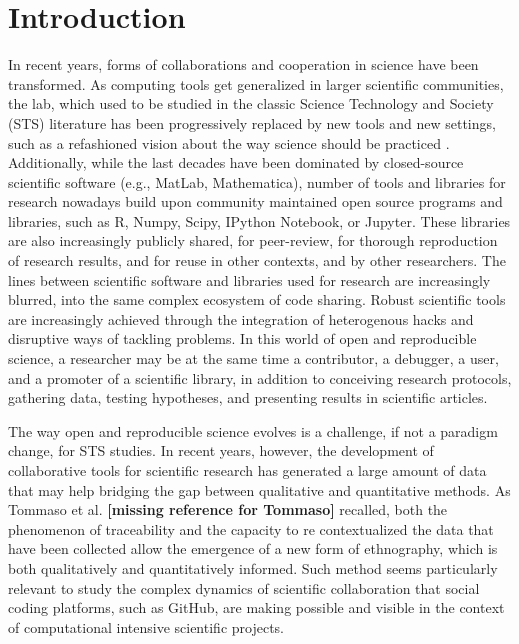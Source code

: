 \section{Introduction}
In recent years, forms of collaborations and cooperation in science have been transformed. As computing tools get generalized in larger scientific communities, the lab, which used to be studied in the classic Science Technology and Society (STS) literature \cite{latour1987science,houdart2008cour} has been progressively replaced by new tools and new settings, such as a refashioned vision \cite{galison1996disunity,kitchin2014big} about the way science should be practiced \cite{calvert2013collaboration,leonelli2012introduction}. Additionally, while the last decades have been dominated by closed-source scientific software (e.g., MatLab, Mathematica), number of tools and libraries for research nowadays build upon community maintained open source programs and libraries, such as R, Numpy, Scipy, IPython Notebook, or Jupyter. These libraries are also increasingly publicly shared, for peer-review, for thorough reproduction of research results, and for reuse in other contexts, and by other researchers. The lines between scientific software and libraries used for research are increasingly blurred, into the same complex ecosystem of code sharing. Robust scientific tools are increasingly achieved through the integration of heterogenous hacks and disruptive ways of tackling problems. In this world of open and reproducible science, a researcher may be at the same time a contributor, a debugger, a user, and a promoter of a scientific library, in addition to conceiving research protocols, gathering data, testing hypotheses, and presenting results in scientific articles.

The way open and reproducible science evolves is a challenge, if not a paradigm change, for STS studies. In recent years, however, the development of collaborative tools for scientific research has generated a large amount of data that may help bridging the gap between qualitative and quantitative methods. As Tommaso et al. \cite{tommaso2015} {\bf [missing reference for Tommaso]} recalled, both the phenomenon of traceability and the capacity to re contextualized the data that have been collected allow the emergence of a new form of ethnography, which is both qualitatively and quantitatively informed. Such method seems particularly relevant to study the complex dynamics of scientific collaboration that social coding platforms, such as GitHub, are making possible and visible in the context of computational intensive scientific projects. 

